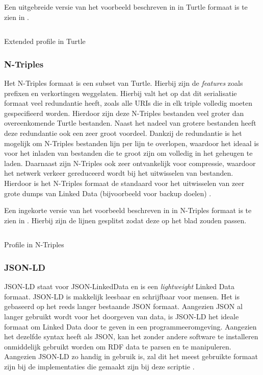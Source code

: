 Een uitgebreide versie van het voorbeeld beschreven in  in Turtle formaat is te zien in .

\begin{listing}[ht]
    \inputminted{turtle}{data/profile.ttl}
    \caption{Extended profile in Turtle}
    \label{listing:profile_turtle}
\end{listing}

\subsubsection{N-Triples}
Het N-Triples formaat is een subset van Turtle. Hierbij zijn de \textit{features} zoals prefixen en verkortingen weggelaten. Hierbij valt het op dat dit serialisatie formaat veel redundantie heeft, zoals alle URIs die in elk triple volledig moeten gespecifieerd worden. Hierdoor zijn deze N-Triples bestanden veel groter dan overeenkomende Turtle bestanden. Naast het nadeel van grotere bestanden heeft deze redundantie ook een zeer groot voordeel. Dankzij de redundantie is het mogelijk om N-Triples bestanden lijn per lijn te overlopen, waardoor het ideaal is voor het inladen van bestanden die te groot zijn om volledig in het geheugen te laden. Daarnaast zijn N-Triples ook zeer ontvankelijk voor compressie, waardoor het netwerk verkeer gereduceerd wordt bij het uitwisselen van bestanden. Hierdoor is het N-Triples formaat de standaard voor het uitwisselen van zeer grote dumps van Linked Data (bijvoorbeeld voor backup doelen) \cite{beckett2014rdfntriples}.

Een ingekorte versie van het voorbeeld beschreven in  in N-Triples formaat is te zien in . Hierbij zijn de lijnen gesplitst zodat deze op het blad zouden passen.

\begin{listing}[ht]
    \inputminted{turtle}{data/profile_short.nt}
    \caption{Profile in N-Triples}
    \label{listing:profile_ntriples}
\end{listing}


\subsubsection{JSON-LD}
JSON-LD staat voor JSON-LinkedData en is een \textit{lightweight} Linked Data formaat. JSON-LD is makkelijk leesbaar en schrijfbaar voor mensen. Het is gebaseerd op het reeds langer bestaande JSON formaat. Aangezien JSON al langer gebruikt wordt voor het doorgeven van data, is JSON-LD het ideale formaat om Linked Data door te geven in een programmeeromgeving. Aangezien het dezelfde syntax heeft als JSON, kan het zonder andere software te installeren onmiddelijk gebruikt worden om RDF data te parsen en te manipuleren. Aangezien JSON-LD zo handig in gebruik is, zal dit het meest gebruikte formaat zijn bij de implementaties die gemaakt zijn bij deze scriptie \cite{sporny2012json}.

